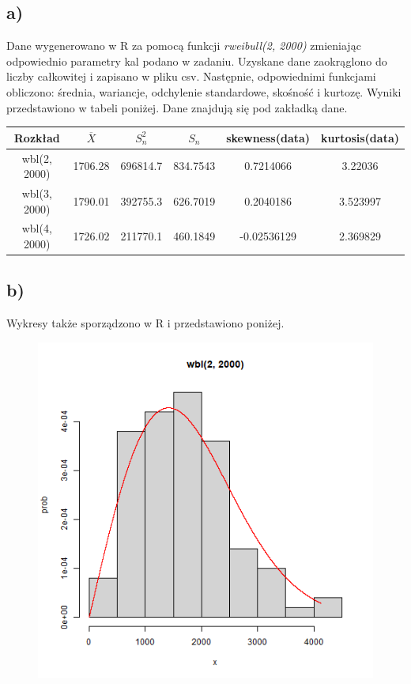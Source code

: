 \documentclass{article}
\begin{document}
\subsection{a)}
Dane wygenerowano w R za pomocą funkcji \textit{rweibull(2, 2000)} zmieniając odpowiednio parametry kal podano w zadaniu. Uzyskane dane zaokrąglono do liczby całkowitej i zapisano w pliku csv. Następnie, odpowiednimi funkcjami obliczono: średnia, wariancje, odchylenie standardowe, skośność i kurtozę. Wyniki przedstawiono w tabeli poniżej. Dane znajdują się pod zakładką dane.
\begin{center} \footnotesize \begin{tabular}{|c|c|c|c|c|c|} \hline
Rozkład & $\overline{X}$ & $S_n^2$ & $S_n$ & skewness(data) & kurtosis(data) \\ \hline
wbl(2, 2000) & 1706.28 & 696814.7 & 834.7543 & 0.7214066 & 3.22036 \\ \hline
wbl(3, 2000) & 1790.01 & 392755.3 & 626.7019 & 0.2040186 & 3.523997 \\ \hline
wbl(4, 2000) & 1726.02 & 211770.1 & 460.1849 & -0.02536129 & 2.369829 \\ \hline
\end{tabular} \end{center}

\newpage
\subsection{b)}
Wykresy także sporządzono w R i przedstawiono poniżej.
\begin{figure}[h!] \begin{center}
\includegraphics[height=0.4\textheight, angle=0]{"kolos2_1.png"}
\end{center} \end{figure}
\end{document}
